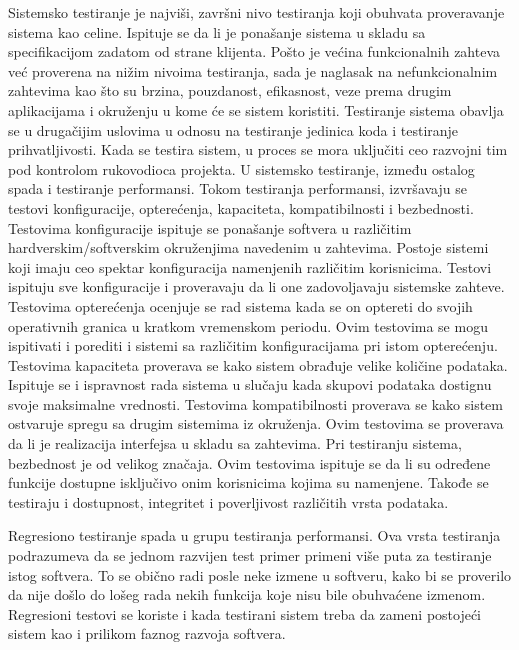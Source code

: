 \documentclass[12pt,oneside]{memoir}
\begin{document}
\par 
Sistemsko testiranje je najviši, završni nivo testiranja koji obuhvata proveravanje sistema kao celine. Ispituje se da li je ponašanje sistema u skladu sa specifikacijom zadatom od strane klijenta.
Pošto je većina funkcionalnih zahteva već proverena na nižim nivoima testiranja, sada je naglasak na nefunkcionalnim zahtevima kao što su brzina, pouzdanost, efikasnost, veze prema drugim aplikacijama i okruženju u kome će se sistem koristiti. Testiranje sistema obavlja se u drugačijim uslovima u odnosu na testiranje jedinica koda i testiranje prihvatljivosti. Kada se testira sistem, u proces se mora uključiti ceo razvojni tim pod kontrolom rukovodioca projekta. U sistemsko testiranje, između ostalog spada i testiranje performansi. Tokom testiranja performansi, izvršavaju se testovi konfiguracije, opterećenja, kapaciteta, kompatibilnosti i bezbednosti. Testovima konfiguracije ispituje se ponašanje softvera u različitim hardverskim/softverskim okruženjima navedenim u zahtevima. Postoje sistemi koji imaju ceo spektar konfiguracija namenjenih različitim korisnicima. Testovi ispituju sve konfiguracije i proveravaju da li one zadovoljavaju sistemske zahteve. Testovima opterećenja ocenjuje se rad sistema kada se on optereti do svojih operativnih granica u kratkom vremenskom periodu. Ovim testovima se mogu ispitivati i porediti i sistemi sa različitim konfiguracijama pri istom opterećenju. Testovima kapaciteta proverava se kako sistem obrađuje velike količine podataka. Ispituje se i ispravnost rada sistema u slučaju kada skupovi podataka dostignu svoje maksimalne vrednosti. Testovima kompatibilnosti proverava se kako sistem ostvaruje spregu sa drugim sistemima iz okruženja. Ovim testovima se proverava da li je realizacija interfejsa u skladu sa  zahtevima. Pri testiranju sistema, bezbednost je od velikog značaja. Ovim testovima ispituje se da li su određene funkcije dostupne isključivo onim korisnicima kojima su namenjene. Takođe se testiraju i dostupnost, integritet i poverljivost različitih vrsta podataka. 
\par 
Regresiono testiranje spada u grupu testiranja performansi. Ova vrsta testiranja podrazumeva da se jednom razvijen test primer primeni više puta za testiranje istog softvera. To se obično radi posle neke izmene u softveru, kako bi se proverilo da nije došlo do lošeg rada nekih funkcija koje nisu bile obuhvaćene izmenom. Regresioni testovi se koriste i kada testirani sistem treba da zameni postojeći sistem kao i prilikom faznog razvoja softvera.
\par
\end{document}
